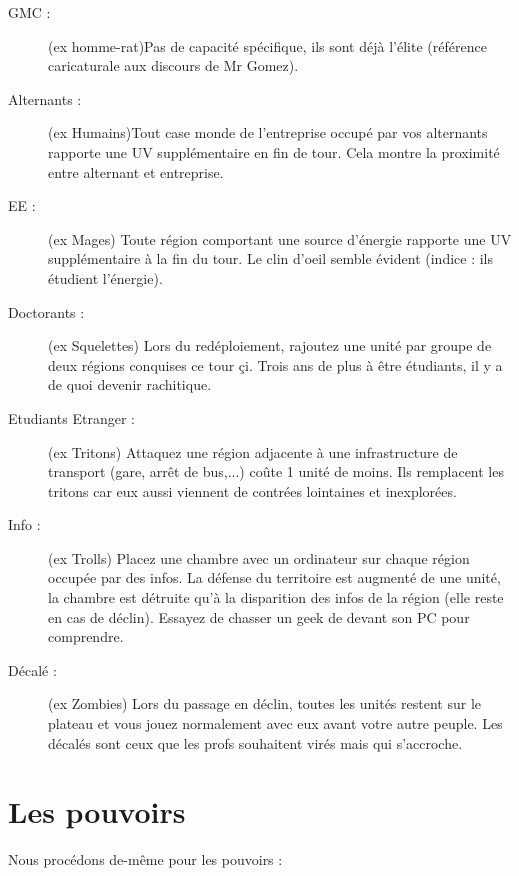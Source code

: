 \documentclass[11pt]{report}
\begin{document}
\begin{description}
		\item[GMC :] (ex homme-rat)Pas de capacité spécifique, ils sont déjà l'élite (référence caricaturale aux discours de Mr Gomez).
		\item[Alternants :] (ex Humains)Tout case monde de l'entreprise occupé par vos alternants rapporte une UV supplémentaire en fin de tour. Cela montre la proximité entre alternant et entreprise.
		\item[EE : ] (ex Mages) Toute région comportant une source d'énergie rapporte une UV supplémentaire à la fin du tour. Le clin d'oeil semble évident (indice : ils étudient l'énergie).
		\item[Doctorants :] (ex Squelettes) Lors du redéploiement, rajoutez une unité par groupe de deux régions conquises ce tour çi. Trois ans de plus à être étudiants, il y a de quoi devenir rachitique.
		\item[Etudiants Etranger :] (ex Tritons) Attaquez une région adjacente à une infrastructure de transport (gare, arrêt de bus,...) coûte 1 unité de moins. Ils remplacent les tritons car eux aussi viennent de contrées lointaines et inexplorées.
		\item[Info :] (ex Trolls) Placez une chambre avec un ordinateur sur chaque région occupée par des infos. La défense du territoire est augmenté de une unité, la chambre est détruite qu'à la disparition des infos de la région (elle reste en cas de déclin). Essayez de chasser un geek de devant son PC pour comprendre.
		\item[Décalé :] (ex Zombies) Lors du passage en déclin, toutes les unités restent sur le plateau et vous jouez normalement avec eux avant votre autre peuple. Les décalés sont ceux que les profs souhaitent virés mais qui s'accroche.
	\end{description}

	\section{Les pouvoirs}
	Nous procédons de-même pour les pouvoirs :
	
\end{document}

